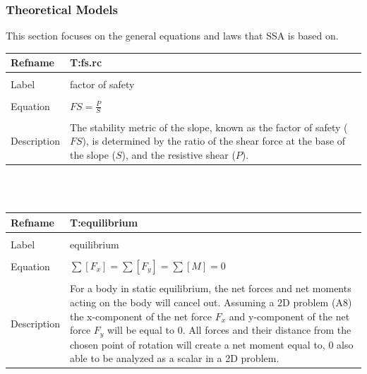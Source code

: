 \documentclass[12pt]{article}
\begin{document}
\subsubsection{Theoretical Models}
\label{Sec:TheoMode}
This section focuses on the general equations and laws that SSA is based on.
~\newline
\noindent \begin{minipage}{\textwidth}
\begin{tabular}{p{} p{}}
\toprule \textbf{Refname} & \textbf{T:fs.rc}
\label{T:fs.rc}
\\ \midrule \\
Label & factor of safety
\\ \midrule \\
Equation & $FS=\frac{P}{S}$
\\ \midrule \\
Description & The stability metric of the slope, known as the factor of safety ($FS$), is determined by the ratio of the shear force at the base of the slope ($S$), and the resistive shear ($P$).
\\ \bottomrule \end{tabular}
\end{minipage}\\
~\newline
\noindent \begin{minipage}{\textwidth}
\begin{tabular}{p{} p{}}
\toprule \textbf{Refname} & \textbf{T:equilibrium}
\label{T:equilibrium}
\\ \midrule \\
Label & equilibrium
\\ \midrule \\
Equation & $\displaystyle\sum{\left[F_{x}\right]}=\displaystyle\sum{\left[F_{y}\right]}=\displaystyle\sum{\left[M\right]}=0$
\\ \midrule \\
Description & For a body in static equilibrium, the net forces and net moments acting on the body will cancel out. Assuming a 2D problem (A8) the x-component of the net force $F_{x}$ and y-component of the net force $F_{y}$ will be equal to $0$. All forces and their distance from the chosen point of rotation will create a net moment equal to, $0$ also able to be analyzed as a scalar in a 2D problem.
\\ \bottomrule \end{tabular}
\end{minipage}\\
\end{document}
